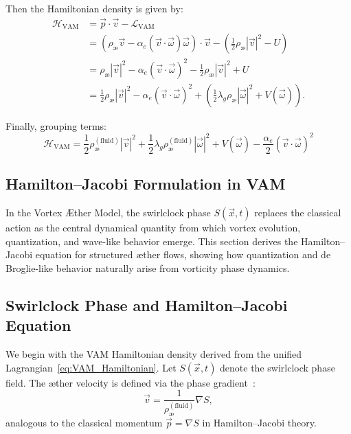 \documentclass[preprint]{revtex4-2}
\begin{document}
Then the Hamiltonian density is given by:
\begin{align*}
\mathcal{H}_\text{VAM} &= \vec{p} \cdot \vec{v} - \mathcal{L}_\text{VAM} \\
&= \left( \rho_\text{\ae} \vec{v} - \alpha_e (\vec{v} \cdot \vec{\omega}) \vec{\omega} \right) \cdot \vec{v}
- \left( \frac{1}{2} \rho_\text{\ae} |\vec{v}|^2 - U \right) \\
&= \rho_\text{\ae} |\vec{v}|^2 - \alpha_e (\vec{v} \cdot \vec{\omega})^2
- \frac{1}{2} \rho_\text{\ae} |\vec{v}|^2 + U \\
&= \frac{1}{2} \rho_\text{\ae} |\vec{v}|^2
- \alpha_e (\vec{v} \cdot \vec{\omega})^2
+ \left( \frac{1}{2} \lambda_g \rho_\text{\ae} |\vec{\omega}|^2 + V(\vec{\omega}) \right).
\end{align*}

Finally, grouping terms:
\begin{equation}
\boxed{
\mathcal{H}_\text{VAM} = \frac{1}{2} \rho_\text{\ae}^{(\text{fluid})} |\vec{v}|^2
+ \frac{1}{2} \lambda_g \rho_\text{\ae}^{(\text{fluid})} |\vec{\omega}|^2
+ V(\vec{\omega})
- \frac{\alpha_e}{2} (\vec{v} \cdot \vec{\omega})^2
}\label{eq:VAM_Hamiltonian}
\end{equation}

\subsection{ Hamilton--Jacobi Formulation in VAM}

In the Vortex \AE ther Model, the swirlclock phase \( S(\vec{x}, t) \) replaces the classical action as the central dynamical quantity from which vortex evolution, quantization, and wave-like behavior emerge. This section derives the Hamilton--Jacobi equation for structured \ae ther flows, showing how quantization and de Broglie-like behavior naturally arise from vorticity phase dynamics.

\subsection*{Swirlclock Phase and Hamilton--Jacobi Equation}

We begin with the VAM Hamiltonian density derived from the unified Lagrangian~\ref{eq:VAM_Hamiltonian}. Let \( S(\vec{x}, t) \) denote the swirlclock phase field. The \ae ther velocity is defined via the phase gradient~\cite{Arnold1998, moffatt1969degree}:
\begin{equation}
\vec{v} = \frac{1}{\rho_\text{\ae}^{(\text{fluid})}} \nabla S,
\end{equation}
analogous to the classical momentum \( \vec{p} = \nabla S \) in Hamilton–Jacobi theory.
\end{document}
